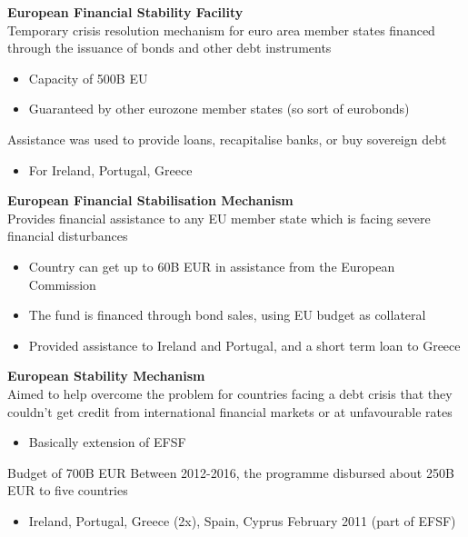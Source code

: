 \documentclass{beamer}
\begin{document}
\begin{frame}
  \textbf{European Financial Stability Facility}\\
  Temporary crisis resolution mechanism for euro area member states financed through the issuance of bonds and other debt instruments
  \begin{itemize}
    \item Capacity of 500B EU
    \item Guaranteed by other eurozone member states (so sort of eurobonds)
  \end{itemize}
    \medskip
   Assistance was used to provide loans, recapitalise banks, or buy sovereign debt    
   \begin{itemize}
     \item For Ireland, Portugal, Greece
   \end{itemize}
\end{frame}

\begin{frame}
  \textbf{European Financial Stabilisation Mechanism}\\
   Provides financial assistance to any EU member state which is facing severe financial disturbances
   \begin{itemize}
     \item Country can get up to 60B EUR in assistance from the European Commission 
     \item The fund is financed through  bond sales, using EU budget as collateral    
    \item Provided assistance to Ireland and Portugal, and a short term loan to Greece
   \end{itemize}
\end{frame}

\begin{frame}
  \textbf{European Stability Mechanism}\\
  Aimed to help overcome the problem for countries facing a debt crisis that they couldn't get credit from international financial markets or at unfavourable rates
  \begin{itemize}
    \item Basically extension of EFSF
  \end{itemize}
  Budget of 700B EUR
  Between 2012-2016, the programme disbursed about 250B EUR to five countries
\begin{itemize}
  \item Ireland, Portugal, Greece (2x), Spain, Cyprus February 2011 (part of EFSF)
\end{itemize}
\end{frame}
\end{document}
